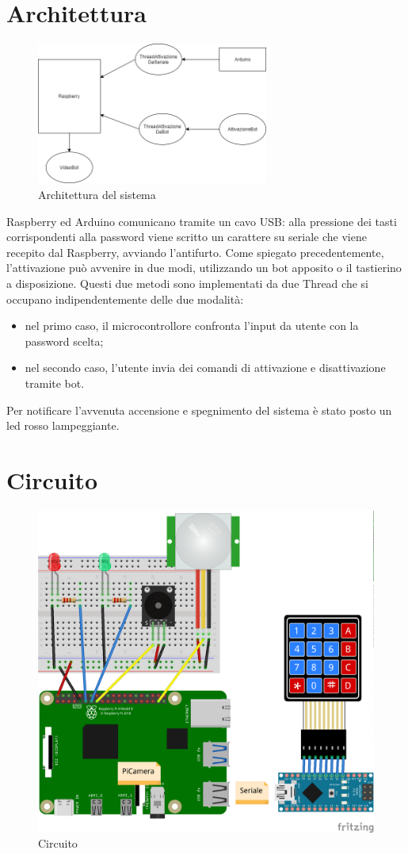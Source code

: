\documentclass[12pt]{article}
\begin{document}
	\section{Architettura}
	\begin{figure}[h]
		\centering
		\includegraphics[width=3.0in]{architettura}
		\caption{Architettura del sistema}
	\end{figure}
	
	Raspberry ed Arduino comunicano tramite un cavo USB: alla pressione dei tasti corrispondenti 
	alla password viene scritto un carattere su seriale che viene recepito dal Raspberry, avviando 
	l'antifurto. Come spiegato precedentemente, l'attivazione può avvenire in due modi, 
	utilizzando un bot apposito o il tastierino a disposizione. Questi due metodi sono implementati 
	da due Thread che si occupano indipendentemente delle due modalità:
	\begin{itemize}
		\item nel primo caso, il microcontrollore confronta l'input da utente con la password scelta;
		\item nel secondo caso, l'utente invia dei comandi di attivazione e disattivazione tramite 
		bot.
	\end{itemize}
	Per notificare l'avvenuta accensione e spegnimento del sistema è stato posto un led rosso 
	lampeggiante.
	\newpage

	\section{Circuito}
	\begin{figure}[h]
		\centering
		\includegraphics[width=4.5in]{circuito}
		\caption{Circuito}
	\end{figure}
	
\end{document}
